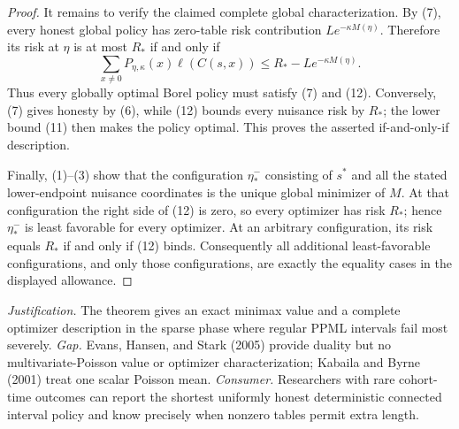 \documentclass{article}
\begin{document}
\begin{proof}
It remains to verify the claimed complete global characterization.  By (7), every honest global policy has zero-table risk contribution \(L e^{-\kappa M(\eta)}\).  Therefore its risk at \(\eta\) is at most \(R_*\) if and only if
\[
 \sum_{x\ne0}P_{\eta,\kappa}(x)\ell(C(s,x))
 \le R_*-L e^{-\kappa M(\eta)}.
\tag{12}
\]
Thus every globally optimal Borel policy must satisfy (7) and (12).  Conversely, (7) gives honesty by (6), while (12) bounds every nuisance risk by \(R_*\); the lower bound (11) then makes the policy optimal.  This proves the asserted if-and-only-if description.

Finally, (1)--(3) show that the configuration \(\eta_*^-\) consisting of \(s^*\) and all the stated lower-endpoint nuisance coordinates is the unique global minimizer of \(M\).  At that configuration the right side of (12) is zero, so every optimizer has risk \(R_*\); hence \(\eta_*^-\) is least favorable for every optimizer.  At an arbitrary configuration, its risk equals \(R_*\) if and only if (12) binds.  Consequently all additional least-favorable configurations, and only those configurations, are exactly the equality cases in the displayed allowance.
\end{proof}
\par\smallskip\noindent \textit{Justification.} The theorem gives an exact minimax value and a complete optimizer description in the sparse phase where regular PPML intervals fail most severely. \textit{Gap.} Evans, Hansen, and Stark (2005) provide duality but no multivariate-Poisson value or optimizer characterization; Kabaila and Byrne (2001) treat one scalar Poisson mean. \textit{Consumer.} Researchers with rare cohort-time outcomes can report the shortest uniformly honest deterministic connected interval policy and know precisely when nonzero tables permit extra length.
\end{document}
